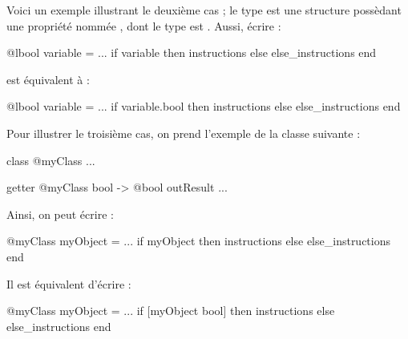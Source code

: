 {{Voici un exemple illustrant le deuxième cas ; le type  est une structure possèdant une propriété nommée , dont le type est . Aussi, écrire :
{
\begin{galgascode}
@lbool variable = ...
if variable then
  instructions
else
  else_instructions
end
\end{galgascode}
}

est équivalent à :
{
\begin{galgascode}
@lbool variable = ...
if variable.bool then
  instructions
else
  else_instructions
end
\end{galgascode}
}

Pour illustrer le troisième cas, on prend l'exemple de la classe suivante :
\begin{galgascode}
class @myClass { ... }

getter @myClass bool -> @bool outResult { ... }
\end{galgascode}

Ainsi, on peut écrire :
{
\begin{galgascode}
@myClass myObject = ...
if myObject then
  instructions
else
  else_instructions
end
\end{galgascode}
}

Il est équivalent d'écrire :
{
\begin{galgascode}
@myClass myObject = ...
if [myObject bool] then
  instructions
else
  else_instructions
end
\end{galgascode}
}


%
%
%
%


}}
